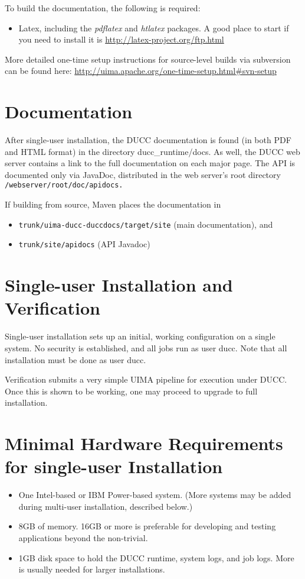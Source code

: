To build the documentation, the following is required:
\begin{itemize}
  \item Latex, including the \emph{pdflatex} and \emph{htlatex} packages.  A good place
    to start if you need to install it is \url{http://latex-project.org/ftp.html}
\end{itemize}

More detailed one-time setup instructions for source-level builds via subversion can be found here:
\url{http://uima.apache.org/one-time-setup.html\#svn-setup}

\section{Documentation}
After single-user installation, the DUCC documentation is found (in both PDF and HTML format) in the directory 
ducc\_runtime/docs.  As well, the DUCC web server contains a link to the full documentation on each major page.
The API is documented only via JavaDoc, distributed in the web server's root directory 
{\tt \duccruntime/webserver/root/doc/apidocs.}  

If building from source, Maven places the documentation in
\begin{itemize}
    \item {\tt trunk/uima-ducc-duccdocs/target/site} (main documentation), and 
    \item {\tt trunk/site/apidocs} (API Javadoc)
\end{itemize}
    
\section{Single-user  Installation and Verification}

Single-user installation sets up an initial, working configuration on a single system.  No security
is established, and all jobs run as user ducc.  Note that all installation must be done as user ducc.

Verification submits a very simple UIMA pipeline for execution under DUCC.  Once this is shown to be
working, one may proceed to upgrade to full installation.


\section{Minimal Hardware Requirements for single-user Installation}
\begin{itemize}
    \item One Intel-based or IBM Power-based system.  (More systems may be added during multi-user
      installation, described below.)

    \item 8GB of memory.  16GB or more is preferable for developing and testing applications beyond
      the non-trivial.  

    \item 1GB disk space to hold the DUCC runtime, system logs, and job logs.  More is
      usually needed for larger installations.  
\end{itemize}

